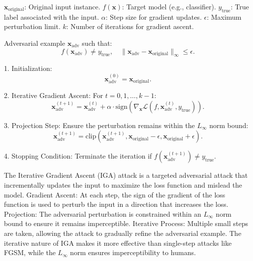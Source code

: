
$\mathbf{x}_{\text{original}}$: Original input instance.  
$f(\mathbf{x})$: Target model (e.g., classifier).  
$y_{\text{true}}$: True label associated with the input.  
$\alpha$: Step size for gradient updates.  
$\epsilon$: Maximum perturbation limit.  
$k$: Number of iterations for gradient ascent.

Adversarial example $\mathbf{x}_{\text{adv}}$ such that:  
\[
f(\mathbf{x}_{\text{adv}}) \neq y_{\text{true}}, \quad \|\mathbf{x}_{\text{adv}} - \mathbf{x}_{\text{original}}\|_{\infty} \leq \epsilon.
\]

1. Initialization:  
   \[
   \mathbf{x}_{\text{adv}}^{(0)} = \mathbf{x}_{\text{original}}.
   \]

2. Iterative Gradient Ascent:  
   For $t = 0, 1, \dots, k-1$:  
   \[
   \mathbf{x}_{\text{adv}}^{(t+1)} = \mathbf{x}_{\text{adv}}^{(t)} + \alpha \cdot \text{sign}\left(\nabla_{\mathbf{x}} \mathcal{L}(f, \mathbf{x}_{\text{adv}}^{(t)}, y_{\text{true}})\right).
   \]

3. Projection Step: Ensure the perturbation remains within the $L_\infty$ norm bound:  
   \[
   \mathbf{x}_{\text{adv}}^{(t+1)} = \text{clip}\left(\mathbf{x}_{\text{adv}}^{(t+1)}, \mathbf{x}_{\text{original}} - \epsilon, \mathbf{x}_{\text{original}} + \epsilon\right).
   \]

4. Stopping Condition: Terminate the iteration if $f(\mathbf{x}_{\text{adv}}^{(t+1)}) \neq y_{\text{true}}$.

The Iterative Gradient Ascent (IGA) attack is a targeted adversarial attack that incrementally updates the input to maximize the loss function and mislead the model. 
Gradient Ascent: At each step, the sign of the gradient of the loss function is used to perturb the input in a direction that increases the loss.  
Projection: The adversarial perturbation is constrained within an $L_\infty$ norm bound to ensure it remains imperceptible.  
Iterative Process: Multiple small steps are taken, allowing the attack to gradually refine the adversarial example.
The iterative nature of IGA makes it more effective than single-step attacks like FGSM, while the $L_\infty$ norm ensures imperceptibility to humans.